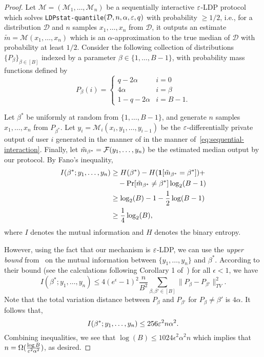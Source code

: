 \begin{proof}
    Let $\mathcal{M}=(\mathcal{M}_1,\dots, \mathcal{M}_n)$ be a sequentially interactive $\varepsilon$-LDP protocol which solves \texttt{LDPstat-quantile}$(\mathcal{D},n,\alpha,\varepsilon,q)$ with probability $\geq 1/2$, i.e., for a distribution $\mathcal{D}$ and $n$ samples $x_1,\dots,x_n$ from $\mathcal{D}$, it outputs an estimate $\tilde m=\mathcal{M}(x_1,\dots, x_n)$ which is an $\alpha$-approximation to the true median of $\mathcal{D}$ with probability at least $1/2$.
    Consider the following collection of distributions $\{P_\beta\}_{\beta \in [B]}$ indexed by a parameter $\beta\in \{1,\dots,B-1\}$, with probability mass functions defined by
    \[
        P_\beta(i) = \begin{cases}
        q - 2\alpha & i = 0 \\
        4\alpha & i = \beta \\
        1-q-2\alpha & i = B-1.
    \end{cases}
    \]

    Let ${\beta^*}$ be uniformly at random from $\{1,\dots,B-1\}$, and generate $n$ samples $x_1, \ldots, x_n$ from $P_{\beta^*}$. Let $y_i=\mathcal{M}_i(x_i,y_1,\dots,y_{i-1})$ be the $\varepsilon$-differentially private output of user $i$ generated in the manner of in the manner of~\eqref{eq:sequential-interaction}. Finally, let $\tilde{m}_{\beta^*}=\mathcal{F}(y_1,\dots, y_n)$ be the estimated median output by our protocol. By Fano's inequality,
    \begin{align*}
        I({\beta^*} ; y_1, \ldots, y_n) &\geq H({\beta^*}) - H(\textbf{1}[\tilde{m}_{\beta^*} = {\beta^*}]) +\\
        &\quad - \textnormal{Pr}[\tilde{m}_{\beta^*} \neq  {\beta^*}] \log_2(B - 1) \\
        &\geq \log_2(B) - 1 - \frac{1}{2} \log(B-1) \\
        &\geq \frac{1}{4} \log_2(B),
    \end{align*}
    where $I$ denotes the mutual information and $H$ denotes the binary entropy.
    
    However, using the fact that our mechanism is $\varepsilon$-LDP, we can use the \emph{upper bound} from~\cite{duchi2013local} on the mutual information between $\{y_1,\dots, y_n\}$ and ${\beta^*}$. According to their bound (see the calculations following Corollary 1 of~\cite{duchi2013local}) for all $\epsilon < 1$, we have 
    \[
    I({\beta^*}; y_1, \ldots, y_n) \leq 4(e^\epsilon-1)^2  \frac{n}{B^2} \sum_{\beta, \beta' \in [B]} \|P_\beta- P_{\beta'}\|_{TV}^2.
    \]
   Note that the total variation distance between $P_\beta$ and $P_{\beta'}$ for $P_\beta\neq \beta'$ is $4\alpha$. It follows that, 
   \[
   I({\beta^*}; y_1, \ldots, y_n) \leq 256 \varepsilon^2n\alpha^2.
   \]
    Combining inequalities, we see that $\log(B) \leq 1024 \epsilon^2 \alpha^2 n$ which implies that $n =\Omega( \frac{\log B}{ \varepsilon^2\alpha^2})$, as desired.
\end{proof}

